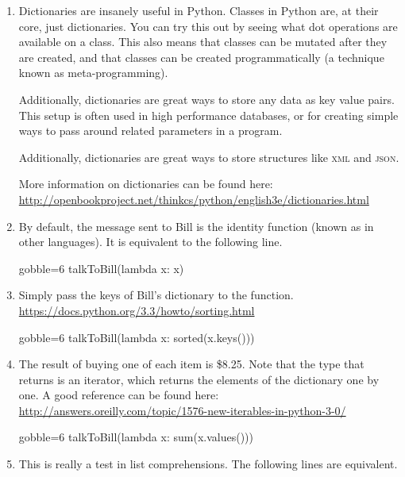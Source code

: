 \documentclass[10pt, letterpaper, acro-macros]{python-problem}
\begin{document}
\begin{enumerate}
  \item Dictionaries are insanely useful in Python. Classes in Python are, at
    their core, just dictionaries. You can try this out by seeing what dot
    operations are available on a class. This also means that classes can
    be mutated after they are created, and that classes can be created
    programmatically (a technique known as meta-programming).

    Additionally, dictionaries are great ways to store any data as key value
    pairs. This setup is often used in high performance databases, or for
    creating simple ways to pass around related parameters in a program.

    Additionally, dictionaries are great ways to store structures like
    \textsc{xml} and \textsc{json}.

    More information on dictionaries can be found here:
    \url{http://openbookproject.net/thinkcs/python/english3e/dictionaries.html}


  \item By default, the message sent to Bill is the identity function (known
    as  in other languages). It is equivalent to the following
    line.

    \begin{pycode*}{gobble=6}
      talkToBill(lambda x: x)
    \end{pycode*}


  \item Simply pass the keys of Bill's dictionary to the 
    function. \url{https://docs.python.org/3.3/howto/sorting.html}

    \begin{pycode*}{gobble=6}
      talkToBill(lambda x: sorted(x.keys()))
    \end{pycode*}


  \item The result of buying one of each item is \$8.25. Note that the type
    that  returns is an iterator, which returns the elements
    of the dictionary one by one. A good reference can be found here:\\
    \url{http://answers.oreilly.com/topic/1576-new-iterables-in-python-3-0/}

    \begin{pycode*}{gobble=6}
      talkToBill(lambda x: sum(x.values()))
    \end{pycode*}


  \item This is really a test in list comprehensions. The following lines are
    equivalent.


\end{enumerate}
\end{document}
